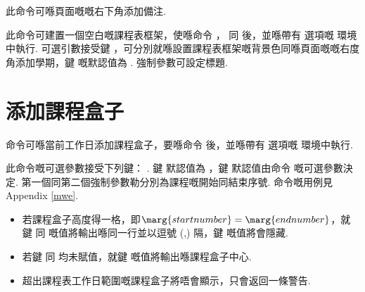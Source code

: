 \documentclass[letterpaper]{l3doc}
\begin{document}
\begin{function}{\more}
  \begin{syntax}
     
  \end{syntax}

  此命令可喺頁面嘅嘅右下角添加備注.
\end{function}

\begin{function}{\maketable}
  \begin{syntax}
       
  \end{syntax}

  此命令可建置一個空白嘅課程表框架，使喺命令 ， 同  後，並喺帶有  選項嘅  環境中執行. 可選引數接受鍵  ，可分別就喺設置課程表框架嘅背景色同喺頁面嘅嘅右度角添加學期，鍵  嘅默認值為 . 強制參數可設定標題.
\end{function}

\section{添加課程盒子}

\begin{function}{\course}
  \begin{syntax}
         
  \end{syntax}

   命令可喺當前工作日添加課程盒子，要喺命令  後，並喺帶有  選項嘅  環境中執行.
  
  此命令嘅可選參數接受下列鍵：    . 鍵  默認值為 ，鍵  默認值由命令  嘅可選參數決定. 第一個同第二個強制參數勒分別為課程嘅開始同結束序號. 命令嘅用例見Appendix \ref{mwe}.

  \begin{itemize}
    \item 若課程盒子高度得一格，即$\marg{start number} = \marg{end number}$，就鍵  同  嘅值將輸出喺同一行並以逗號 (,) 隔，鍵  嘅值將會隱藏.
    \item 若鍵  同  均未賦值，就鍵  嘅值將輸出喺課程盒子中心.
    \item 超出課程表工作日範圍嘅課程盒子將唔會顯示，只會返回一條警告.
  \end{itemize}
\end{function}
\end{document}
